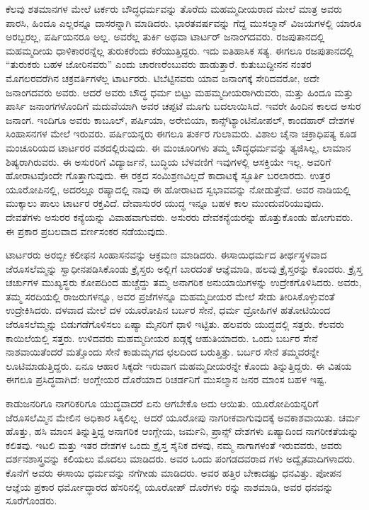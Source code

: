 ಕೆಲವು ಶತಮಾನಗಳ ಮೇಲೆ ಟರ್ಕರು ಬೌದ್ಧಧರ್ಮವನ್ನು ತೊರೆದು ಮಹಮ್ಮದೀಯ\break ರಾದ ಮೇಲೆ ಮಾತ್ರ ಅವರು ಪಾರಸಿ, ಹಿಂದೂ ಎಲ್ಲರನ್ನೂ ದಾಸರನ್ನಾಗಿ ಮಾಡಿದರು. ಭಾರತವರ್ಷವನ್ನು ಗೆದ್ದ ಮುಸಲ್ಮಾನ್​ ವಿಜಯಗಳಲ್ಲಿ ಯಾರೂ ಅರಬ್ಬರಲ್ಲ, ಪರ್ಷಿಯನರೂ ಅಲ್ಲ. ಅವರೆಲ್ಲ ತುರ್ಕಿ ಅಥವಾ ಟಾರ್ಟರ್​ ಜನಾಂಗದವರು. ರಜಪುತಾನ\break ದಲ್ಲಿ ಮಹಮ್ಮದೀಯ ಧಾಳಿಕಾರರನ್ನೆಲ್ಲ ತುರುಕರೆಂದು ಕರೆಯುತ್ತಿದ್ದರು. ಇದು ಐತಿಹಾಸಿಕ ಸತ್ಯ. ಈಗಲೂ ರಜಪುತಾನದಲ್ಲಿ “ತುರುಕರು ಬಹಳ ಜೋರಿನವರು” ಎಂದು ಚಾರಣರೆಂಬುವರು ಹಾಡುತ್ತಾರೆ. ಕುತುಬುದ್ದೀನನ ನಂತರ ಮೊಗಲರವರೆಗಿನ ಚಕ್ರವರ್ತಿ\break ಗಳೆಲ್ಲ ಟಾರ್ಟರರು. ಟಿಬೆಟ್ಟಿನವರು ಯಾವ ಜನಾಂಗಕ್ಕೆ ಸೇರಿದವರೋ, ಅದೇ ಜನಾಂಗದವರು ಅವರು. ಆದರೆ ಅವರು ಬೌದ್ಧ ಧರ್ಮ ಬಿಟ್ಟು ಮಹಮ್ಮದೀಯರಾಗಿರುವರು, ಮತ್ತು ಹಿಂದೂ ಮತ್ತು ಪಾರ್ಸಿ ಜನಾಂಗಗಳೊಂದಿಗೆ ಮದುವೆಯಾಗಿ ಅವರ ಚಪ್ಪಟೆ ಮೂಗು ಬದಲಾಯಿಸಿದೆ. ಇವರೇ ಹಿಂದಿನ ಕಾಲದ ಅಸುರ ಜನಾಂಗ. ಇಂದಿಗೂ ಅವರು ಕಾಬೂಲ್​, ಪರ್ಷಿಯಾ, ಅರೇಬಿಯಾ, ಕಾನ್ಸ್​ಟ್ಯಾಂಟಿನೋಪಲ್​, ಕಾಂದಹಾರ್​ ದೇಶಗಳ ಸಿಂಹಾಸನಗಳ ಮೇಲೆ ಇರುವರು. ಪರ್ಷಿಯನ್ನರು ಈಗಲೂ ತುರ್ಕರ ಗುಲಾಮರು. ವಿಶಾಲ ಚೈನಾ ಚಕ್ರಾಧಿಪತ್ಯ ಕೂಡ ಮಂಚೂರಿಯದ ಟಾರ್ಟರರ ವಶದಲ್ಲಿರುವುದು. ಈ ಮಂಚೂರಿಗಳು ತಮ್ಮ ಬೌದ್ಧಧರ್ಮವನ್ನು ತ್ಯಜಿಸಿಲ್ಲ, ಲಾಮಾನ ಶಿಷ್ಯರಾಗಿರುವರು. ಈ ಅಸುರರಿಗೆ ವಿದ್ಯಾರ್ಜನೆ, ಬುದ್ಧಿಯ ಬೆಳವಣಿಗೆ ಇವುಗಳಲ್ಲಿ ಆಸಕ್ತಿಯೇ ಇಲ್ಲ. ಅವರಿಗೆ ಹೋರಾಟವೊಂದೇ ಗೊತ್ತಾಗುವುದು. ಈ ರಕ್ತದ ಸಂಮಿಶ್ರಣವಿಲ್ಲದೆ ಕಾದಾಟಕ್ಕೆ ಸ್ಫೂರ್ತಿ ಬರಲಾರದು. ಉತ್ತರ ಯೂರೋಪಿನಲ್ಲಿ, ಅದರಲ್ಲೂ ರಷ್ಯಾದಲ್ಲಿ ನಾವು ಈ ಹೋರಾಟದ ಸ್ವಭಾವವನ್ನು ನೋಡುತ್ತೇವೆ. ಅವರ ನಾಡಿಯಲ್ಲಿ ಮುಕ್ಕಾಲು ಪಾಲು ಟಾರ್ಟರ ರಕ್ತವಿದೆ. ದೇವಾಸುರರ ಯುದ್ಧ ಇನ್ನೂ ಬಹಳ ಕಾಲ ಮುಂದುವರಿಯುವುದು. ದೇವತೆಗಳು ಅಸುರರ ಕನ್ಯೆಯನ್ನು ವಿವಾಹವಾಗುವರು. ಅಸುರರು ದೇವಕನ್ಯೆಯರನ್ನು ಹೊತ್ತುಕೊಂಡು ಹೋಗುವರು. ಈ ಪ್ರಕಾರ ಪ್ರಬಲವಾದ ವರ್ಣಸಂಕರ ನಡೆಯುವುದು.

\vskip 5pt

ಟಾರ್ಟರರು ಅರಬ್ಬೀ ಕಲೀಫನ ಸಿಂಹಾಸನವನ್ನು ಆಕ್ರಮಣ ಮಾಡಿದರು. ಈಸಾಯಿ\break ಧರ್ಮದ ತೀರ್ಥಸ್ಥಳವಾದ ಜೆರೂಸಲೆಮ್ಮನ್ನು ಸ್ವಾಧೀನಪಡಿಸಿಕೊಂಡು ಕ್ರೈಸ್ತರು ಅಲ್ಲಿಗೆ ಬಾರದಂತೆ ಆಜ್ಞೆಮಾಡಿ, ಹಲವು ಕ್ರೈಸ್ತರನ್ನು ಕೊಂದರು. ಕ್ರೈಸ್ತ ಚರ್ಚುಗಳ ಮುಖ್ಯಸ್ಥರು ಕೋಪದಿಂದ ಹುಚ್ಚೆದ್ದು ತಮ್ಮ ಅನಾಗರಿಕ ಅನುಯಾಯಿಗಳನ್ನು ಉದ್ರೇಕಗೊಳಿಸಿದರು. ಅವರು, ತಮ್ಮ ಸರದಿಯಲ್ಲಿ ರಾಜರುಗಳನ್ನೂ, ಅವರ ಪ್ರಜೆಗಳನ್ನೂ ಮಹಮ್ಮದೀಯರ ಮೇಲೆ ಸೇಡು ತೀರಿಸಿಕೊಳ್ಳುವಂತೆ ಉದ್ರೇಕಿಸಿದರು. ದಳವಾದ ಮೇಲೆ ದಳ ಯೂರೋಪಿನ ಬರ್ಬರ ಸೇನೆ, ಧರ್ಮ ದ್ರೋಹಿಗಳ ಹತೋಟಿಯಿಂದ ಜೆರೂಸಲೆಮ್ಮನ್ನು ಬಿಡುಗಡೆಗೊಳಿ\break ಸಲು ಏಷ್ಯಾ ಮೈನರಿಗೆ ಧಾಳಿ ಇಟ್ಟಿತು. ಹಲವರು ಯುದ್ಧದಲ್ಲಿ ಸತ್ತರು. ಕೆಲವರು ಕಾಯಿಲೆಯಲ್ಲಿ ಸತ್ತರು. ಉಳಿದವರು ಮಹಮ್ಮದೀಯರ ಖಡ್ಗಕ್ಕೆ ಆಹುತಿಯಾದರು. ಒಂದು ಬರ್ಬರ ಸೇನೆ ನಾಶವಾಯಿತೆಂದರೆ ಮತ್ತೊಂದು ಸೇನೆ ಕಾಡುಮೃಗದ ಛಲದಿಂದ ಬರುತ್ತಿತ್ತು. ಬರ್ಬರ ಸೇನೆ ತಮ್ಮವರನ್ನೇ ಲೂಟಿಮಾಡುತ್ತಿದ್ದರು. ಏನೂ ಆಹಾರ ಸಿಕ್ಕದೇ ಇರುವಾಗ ಮಹಮ್ಮದೀಯರನ್ನೇ ಕೊಂದು ತಿನ್ನುತ್ತಿದ್ದರು. ಈ ವಿಷಯ ಈಗಲೂ ಪ್ರಸಿದ್ಧ\break ವಾಗಿದೆ: ಆಂಗ್ಲೇಯರ ದೊರೆಯಾದ ರಿಚರ್ಡನಿಗೆ ಮುಸಲ್ಮಾನ ಜನರ ಮಾಂಸ ಬಹಳ ಇಷ್ಟ.

\vskip 5pt

ಕಾಡುಜನರಿಗೂ ನಾಗರಿಕರಿಗೂ ಯುದ್ಧವಾದರೆ ಏನು ಆಗಬೇಕೊ ಅದು ಆಯಿತು. ಯೂರೋಪಿಯನ್ನರಿಗೆ ಜೆರೂಸಲೆಮ್ಮಿನ ಮೇಲಿನ ಅಧಿಕಾರ ಸಿಕ್ಕಲಿಲ್ಲ. ಆದರೆ ಯೂರೋಪು ನಾಗರೀಕವಾಗುವುದಕ್ಕೆ ಅವಕಾಶವಾಯಿತು. ಚರ್ಮ ಹೊತ್ತು, ಹಸಿ ಮಾಂಸ ತಿನ್ನುತ್ತಿದ್ದ ಅನಾಗರಿಕ ಆಂಗ್ಲೇಯ, ಜರ್ಮನಿ, ಪ್ರಾನ್ಸ್​ ದೇಶಗಳು ಏಷ್ಯಾದಿಂದ ನಾಗರೀಕತೆಯನ್ನು ಕಲಿತವು. ಇಟಲಿ ಮತ್ತು ಇತರ ದೇಶಗಳ ಒಂದು ಕ್ರೈಸ್ತ ಸೈನಿಕ ದಳವು, ನಮ್ಮ ನಾಗಾಗಳಂತೆ ಇರುವವರು, ಅವರು ದರ್ಶನಶಾಸ್ತ್ರವನ್ನು ಕಲಿಯಲು ಮೊದಲು ಮಾಡಿದರು. ಅವರ ಒಂದು ಪಂಗಡದವರಾದ ಗಳು ಅದ್ವೈತವಾದಿಗಳಾದರು. ಕೊನೆಗೆ ಅವರು ಈಸಾಯಿ ಧರ್ಮವನ್ನು ನಗೆಗೀಡು ಮಾಡಿದರು. ಅವರ ಹತ್ತಿರ ಬೇಕಾದಷ್ಟು ಧನವಿತ್ತು. ಪೋಪನ ಆಜ್ಞೆಯ ಪ್ರಕಾರ ಧರ್ಮೋದ್ಧಾರದ ಹೆಸರಿನಲ್ಲಿ ಯೂರೋಪ್​ ದೊರೆಗಳು ರನ್ನು ನಾಶಮಾಡಿ, ಅವರ ಧನವನ್ನು ಸೂರೆಗೊಂಡರು.


